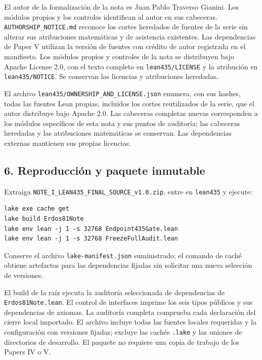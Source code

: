 \documentclass[spanish,11pt,a4paper]{article}
\begin{document}
El autor de la formalización de la nota es Juan Pablo Traverso Gianini.
Los módulos propios y los controles identifican al autor en sus
cabeceras. \nolinkurl{AUTHORSHIP_NOTICE.md} reconoce los cortes heredados
de fuentes de la serie sin alterar sus atribuciones matemáticas y de
asistencia existentes. Las dependencias de Paper V utilizan la versión
de fuentes con crédito de autor registrada en el manifiesto. Los módulos
propios y controles de la nota se distribuyen bajo Apache License 2.0,
con el texto completo en \nolinkurl{lean435/LICENSE} y la atribución en
\nolinkurl{lean435/NOTICE}. Se conservan las licencias y atribuciones
heredadas.

El archivo \nolinkurl{lean435/OWNERSHIP_AND_LICENSE.json} enumera, con
sus hashes, todas las fuentes Lean propias, incluidos los cortes
reutilizados de la serie, que el autor distribuye bajo Apache 2.0. Las
cabeceras completas nuevas corresponden a los módulos específicos de
esta nota y sus puntos de auditoría; las cabeceras heredadas y las
atribuciones matemáticas se conservan. Las dependencias externas
mantienen sus propias licencias.

\subsection{6. Reproducción y paquete
inmutable}\label{reproducciuxf3n-y-paquete-inmutable}

Extraiga \nolinkurl{NOTE_I_LEAN435_FINAL_SOURCE_v1.0.zip}, entre en
\nolinkurl{lean435} y ejecute:

\begin{verbatim}
lake exe cache get
lake build Erdos81Note
lake env lean -j 1 -s 32768 Endpoint435Gate.lean
lake env lean -j 1 -s 32768 FreezeFullAudit.lean
\end{verbatim}

Conserve el archivo \nolinkurl{lake-manifest.json} suministrado; el comando
de caché obtiene artefactos para las dependencias fijadas sin solicitar
una nueva selección de versiones.

El build de la raíz ejecuta la auditoría seleccionada de dependencias de
\nolinkurl{Erdos81Note.lean}. El control de interfaces imprime los seis
tipos públicos y sus dependencias de axiomas. La auditoría completa
comprueba cada declaración del cierre local importado. El archivo
incluye todas las fuentes locales requeridas y la configuración con
versiones fijadas; excluye las cachés \nolinkurl{.lake} y las uniones de
directorios de desarrollo. El paquete no requiere una copia de trabajo
de los Papers IV o V.
\end{document}
